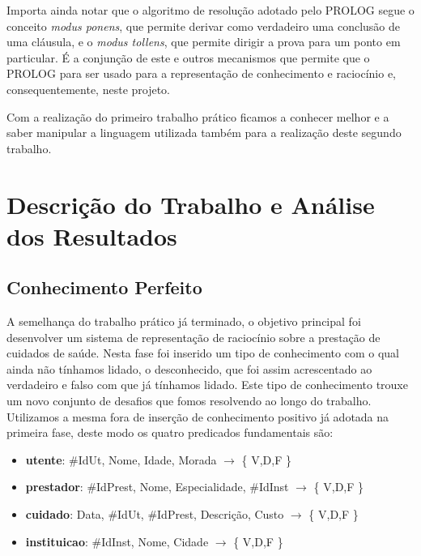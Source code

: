 \documentclass[a4paper]{article}
\begin{document}
Importa ainda notar que o algoritmo de resolução adotado pelo PROLOG segue o conceito \textit{modus ponens}, que permite derivar como verdadeiro uma conclusão de uma cláusula, e o \textit{modus tollens}, que permite dirigir a prova para um ponto em particular. É a conjunção de este e outros mecanismos que permite que o PROLOG para ser usado para a representação de conhecimento e raciocínio e, consequentemente, neste projeto.

Com a realização do primeiro trabalho prático ficamos a conhecer melhor e a saber manipular a linguagem utilizada também para a realização deste segundo trabalho.

\section{Descrição do Trabalho e Análise dos Resultados}

\subsection{Conhecimento Perfeito}


A semelhança do trabalho prático já terminado, o objetivo principal foi desenvolver um sistema de representação de raciocínio sobre a prestação de cuidados de saúde. Nesta fase foi inserido um tipo de conhecimento com o qual ainda não tínhamos lidado, o desconhecido, que foi assim acrescentado ao verdadeiro e falso com que já tínhamos lidado. Este tipo de conhecimento trouxe um novo conjunto de desafios que fomos resolvendo ao longo do trabalho. Utilizamos a mesma fora de inserção de conhecimento positivo já adotada na primeira fase, deste modo os quatro predicados fundamentais são:

\begin{itemize}
    \item \textbf{utente}: \#IdUt, Nome, Idade, Morada \( \rightarrow \) \{ V,D,F \}
    \item \textbf{prestador}: \#IdPrest, Nome, Especialidade, \#IdInst \( \rightarrow \) \{ V,D,F \}
    \item \textbf{cuidado}: Data, \#IdUt, \#IdPrest, Descrição, Custo \( \rightarrow \) \{ V,D,F \}
    \item \textbf{instituicao}: \#IdInst, Nome, Cidade \( \rightarrow \) \{ V,D,F \}
\end{itemize}
\end{document}
